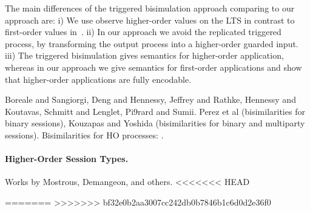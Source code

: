 The main differences of the triggered
bisimulation approach comparing to our approach are:
i) We use observe higher-order values on the LTS in contrast to first-order 
values in~\cite{DBLP:journals/lmcs/JeffreyR05}.
ii) In our approach we avoid the replicated triggered process,
by transforming the output process into a higher-order guarded input.
iii) The triggered bisimulation gives semantics for higher-order application,
whereas in our approach we give semantics for first-order applications
and show that higher-order applications are fully encodable.

Boreale and Sangiorgi, 
Deng and Hennessy, 
Jeffrey and Rathke, Hennessy and Koutavas, Schmitt and Lenglet, Pi\E9rard and Sumii.
Perez et al (bisimilarities for binary sessions), Kouzapas and Yoshida (bisimilarities for binary and multiparty sessions).
Bisimilarities for HO processes: \cite{Xu07}.

\paragraph{Higher-Order Session Types.}
Works by Mostrous, Demangeon, and others.
<<<<<<< HEAD

=======
>>>>>>> bf32e0b2aa3007cc242db0b7846b1c6d0d2e36f0
